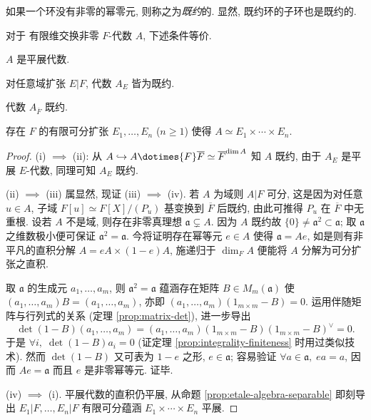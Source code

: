 如果一个环没有非零的幂零元, 则称之为\emph{既约}的. 显然, 既约环的子环也是既约的.
\begin{corollary}\label{prop:etale-alg-characterization}
	对于 有限维交换非零 $F$-代数 $A$, 下述条件等价.
	\begin{compactenum}[(i)]
		\item $A$ 是平展代数.
		\item 对任意域扩张 $E|F$, 代数 $A_E$ 皆为既约.
		\item 代数 $A_{\overline{F}}$ 既约.
		\item 存在 $F$ 的有限可分扩张 $E_1, \ldots, E_n$ ($n \geq 1$) 使得 $A \simeq E_1 \times \cdots \times E_n$.
	\end{compactenum}
\end{corollary}
\begin{proof}
	(i) $\implies$ (ii): 从 $A \hookrightarrow A \dotimes{F} \overline{F} \simeq \overline{F}^{\dim A}$ 知 $A$ 既约, 由于 $A_E$ 是平展 $E$-代数, 同理可知 $A_E$ 既约.

	(ii) $\implies$ (iii) 属显然, 现证 (iii) $\implies$ (iv). 若 $A$ 为域则 $A|F$ 可分, 这是因为对任意 $u \in A$, 子域 $F[u] \simeq F[X]/(P_u)$ 基变换到 $\overline{F}$ 后既约, 由此可推得 $P_u$ 在 $\overline{F}$ 中无重根. 设若 $A$ 不是域, 则存在非零真理想 $\mathfrak{a} \subsetneq A$. 因为 $A$ 既约故 $\{0\} \neq \mathfrak{a}^2 \subset \mathfrak{a}$; 取 $\mathfrak{a}$ 之维数极小便可保证 $\mathfrak{a}^2 = \mathfrak{a}$. 今将证明存在幂等元 $e \in A$ 使得 $\mathfrak{a} = Ae$, 如是则有非平凡的直积分解 $A = eA \times (1-e)A$, 施递归于 $\dim_F A$ 便能将 $A$ 分解为可分扩张之直积.

	取 $\mathfrak{a}$ 的生成元 $a_1, \ldots, a_m$, 则 $\mathfrak{a}^2 = \mathfrak{a}$ 蕴涵存在矩阵 $B \in M_m(\mathfrak{a})$ 使 $(a_1, \ldots, a_m) B = (a_1, \ldots, a_m)$, 亦即 $(a_1, \ldots, a_m) \left( 1_{m \times m} - B \right) = 0$. 运用伴随矩阵与行列式的关系 (定理 \ref{prop:matrix-det}), 进一步导出
	\[ \det(1-B) (a_1, \ldots, a_m) = (a_1, \ldots, a_m) \left( 1_{m \times m} - B \right) \left( 1_{m \times m} - B \right)^\vee = 0. \]
	于是 $\forall i,\; \det(1-B)a_i = 0$ (证定理 \ref{prop:integrality-finiteness} 时用过类似技术). 然而 $\det(1-B)$ 又可表为 $1-e$ 之形, $e \in \mathfrak{a}$; 容易验证 $\forall a \in \mathfrak{a},\; ea = a$, 因而 $Ae = \mathfrak{a}$ 而且 $e$ 是非零幂等元. 证毕.
	
	(iv) $\implies$ (i). 平展代数的直积仍平展, 从命题 \ref{prop:etale-algebra-separable} 即刻导出 $E_1|F, \ldots, E_n|F$ 有限可分蕴涵 $E_1 \times \cdots \times E_n$ 平展.
\end{proof}

